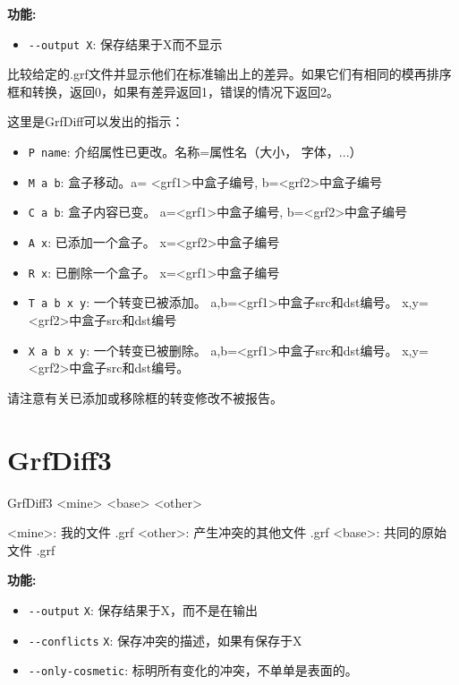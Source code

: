 \noindent \textbf{功能:}
\begin{itemize}
\item \verb+--output X+: 保存结果于X而不显示 
\end{itemize}
         
比较给定的.grf文件并显示他们在标准输出上的差异。如果它们有相同的模再排序框和转换，返回0，如果有差异返回1，错误的情况下返回2。

这里是GrfDiff可以发出的指示：

		 

\begin{itemize}
		 
\item \verb+P name+: 介绍属性已更改。名称=属性名（大小，
字体，...）
\item \verb+M a b+:  盒子移动。a= <grf1>中盒子编号, b=<grf2>中盒子编号
\item \verb+C a b+:  盒子内容已变。 a=<grf1>中盒子编号, b=<grf2>中盒子编号
\item \verb+A x+:    已添加一个盒子。 x=<grf2>中盒子编号
\item \verb+R x+:    已删除一个盒子。 x=<grf1>中盒子编号
\item \verb+T a b x y+: 一个转变已被添加。 a,b=<grf1>中盒子src和dst编号。
	x,y= <grf2>中盒子src和dst编号
\item \verb+X a b x y+: 一个转变已被删除。 a,b=<grf1>中盒子src和dst编号。
	x,y=<grf2>中盒子src和dst编号。
\end{itemize}
		 
请注意有关已添加或移除框的转变修改不被报告。





\section{GrfDiff3}
GrfDiff3 <mine> <base> <other>

<mine>: 我的文件 .grf
<other>: 产生冲突的其他文件 .grf 
<base>: 共同的原始文件 .grf 

\bigskip
\noindent \textbf{功能:}
\begin{itemize}
\item \verb+--output+ \verb+X+: 保存结果于X，而不是在输出
\item \verb+--conflicts+ \verb+X+: 保存冲突的描述，如果有保存于X
\item \verb+--only-cosmetic+: 标明所有变化的冲突，不单单是表面的。

\end{itemize}

